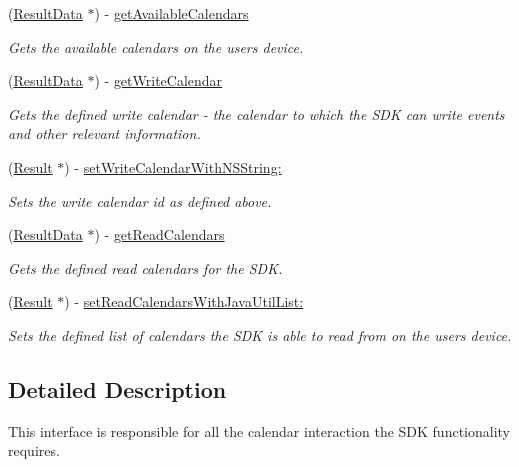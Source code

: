 \begin{DoxyCompactItemize}
\item 
(\hyperlink{interface_result_data}{Result\+Data} $\ast$) -\/ \hyperlink{protocol_i_calendar_details_provider-p_ad37041e3bbe24889e6494af605e87d61}{get\+Available\+Calendars}
\begin{DoxyCompactList}\small\item\em Gets the available calendars on the user\textquotesingle{}s device. \end{DoxyCompactList}\item 
(\hyperlink{interface_result_data}{Result\+Data} $\ast$) -\/ \hyperlink{protocol_i_calendar_details_provider-p_af0e335a9f212eee9c37e9ce7bd8b51ed}{get\+Write\+Calendar}
\begin{DoxyCompactList}\small\item\em Gets the defined write calendar -\/ the calendar to which the S\+D\+K can write events and other relevant information. \end{DoxyCompactList}\item 
(\hyperlink{interface_result}{Result} $\ast$) -\/ \hyperlink{protocol_i_calendar_details_provider-p_a53140c4f14c778a9255bec0935da8831}{set\+Write\+Calendar\+With\+N\+S\+String\+:}
\begin{DoxyCompactList}\small\item\em Sets the write calendar id as defined above. \end{DoxyCompactList}\item 
(\hyperlink{interface_result_data}{Result\+Data} $\ast$) -\/ \hyperlink{protocol_i_calendar_details_provider-p_aaa5d7fb09f05b9bf0f12ae8dc8780210}{get\+Read\+Calendars}
\begin{DoxyCompactList}\small\item\em Gets the defined read calendars for the S\+D\+K. \end{DoxyCompactList}\item 
(\hyperlink{interface_result}{Result} $\ast$) -\/ \hyperlink{protocol_i_calendar_details_provider-p_a5205f8c02f82ecbb2c917bc2a6eba003}{set\+Read\+Calendars\+With\+Java\+Util\+List\+:}
\begin{DoxyCompactList}\small\item\em Sets the defined list of calendars the S\+D\+K is able to read from on the user\textquotesingle{}s device. \end{DoxyCompactList}\end{DoxyCompactItemize}


\subsection{Detailed Description}
This interface is responsible for all the calendar interaction the S\+D\+K functionality requires. 

